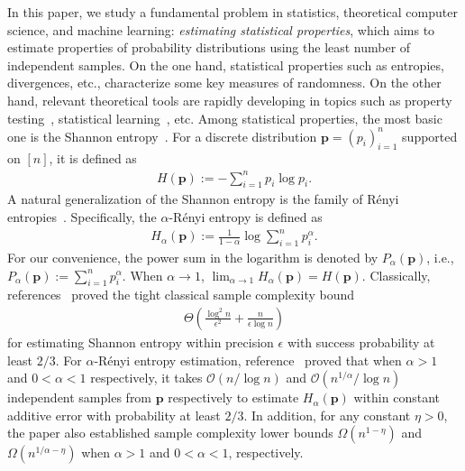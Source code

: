 \documentclass[journal]{IEEEtran}
\begin{document}
In this paper, we study a fundamental problem in statistics, theoretical computer science, and machine learning: \emph{estimating statistical properties}, which aims to estimate properties of probability distributions using the least number of independent samples. On the one hand, statistical properties such as entropies, divergences, etc., characterize some key measures of randomness. On the other hand, relevant theoretical tools are rapidly developing in topics such as property testing~\cite{ron2010algorithmic}, statistical learning~\cite{valiant2011testing}, etc. Among statistical properties, the most basic one is the Shannon entropy~\cite{ShannonEntropy}. For a discrete distribution $\mathbf{p}=(p_{i})_{i=1}^{n}$ supported on $[n]$, it is defined as
\begin{align}
    H(\mathbf{p}):=-\sum_{i=1}^{n}p_{i}\log p_{i}.
\end{align}
A natural generalization of the Shannon entropy is the family of R{\'e}nyi entropies~\cite{renyi1961measures}. Specifically, the $\alpha$-R{\'e}nyi entropy is defined as
\begin{align}\label{eq:Renyi}
    H_\alpha(\mathbf{p}) := \frac{1}{1-\alpha} \log \sum_{i=1}^n p_i^\alpha.
\end{align}
For our convenience, the power sum in the logarithm is denoted by $P_\alpha(\mathbf{p})$, i.e., $P_\alpha(\mathbf{p}) := \sum_{i=1}^n p_i^\alpha$. When $\alpha\to 1$, $\lim_{\alpha\to 1} H_{\alpha}(\mathbf{p})=H(\mathbf{p})$. Classically, references~\cite{jiao2015minimax,wu2016minimax} proved the tight classical sample complexity bound
\begin{align}\label{eq:Shannon-bound-classical}
\Theta\left(\frac{\log^{2}n}{\epsilon^{2}}+\frac{n}{\epsilon \log n}\right)
\end{align}
for estimating Shannon entropy within precision $\epsilon$ with success probability at least $2/3$. For $\alpha$-R{\'e}nyi entropy estimation, reference~\cite{acharya2016estimating} proved that when $\alpha>1$ and $0<\alpha<1$ respectively, it takes $\mathcal{O}(n/\log n)$ and $\mathcal{O}(n^{1/\alpha}/\log n)$ independent samples from $\mathbf{p}$ respectively to estimate $H_{\alpha}(\mathbf{p})$ within constant additive error with probability at least $2/3$. In addition, for any constant $\eta>0$, the paper also established sample complexity lower bounds $\Omega(n^{1-\eta})$ and $\Omega(n^{1/\alpha-\eta})$ when $\alpha>1$ and $0<\alpha<1$, respectively.
\end{document}
